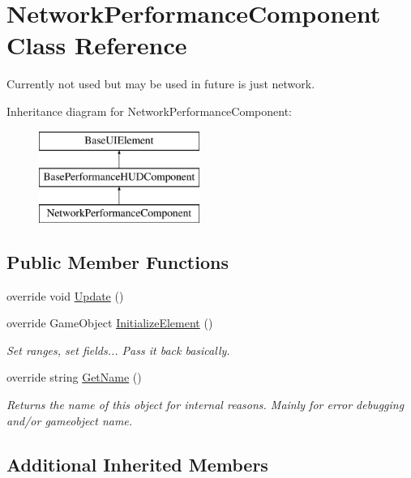 \hypertarget{class_network_performance_component}{}\section{Network\+Performance\+Component Class Reference}
\label{class_network_performance_component}


Currently not used but may be used in future is just network.  


Inheritance diagram for Network\+Performance\+Component\+:\begin{figure}[H]
\begin{center}
\leavevmode
\includegraphics[height=3.000000cm]{class_network_performance_component}
\end{center}
\end{figure}
\subsection*{Public Member Functions}
\begin{DoxyCompactItemize}
\item 
override void \hyperlink{class_network_performance_component_a2742830b63cb6b4a70dedcb670d91d29}{Update} ()
\item 
override Game\+Object \hyperlink{class_network_performance_component_ae8aa1763b5e0e67ee68f8433fa5c3dec}{Initialize\+Element} ()
\begin{DoxyCompactList}\small\item\em Set ranges, set fields... Pass it back basically. \end{DoxyCompactList}\item 
override string \hyperlink{class_network_performance_component_a85df95c2eb70be4313719be4793ad409}{Get\+Name} ()
\begin{DoxyCompactList}\small\item\em Returns the name of this object for internal reasons. Mainly for error debugging and/or gameobject name. \end{DoxyCompactList}\end{DoxyCompactItemize}
\subsection*{Additional Inherited Members}


